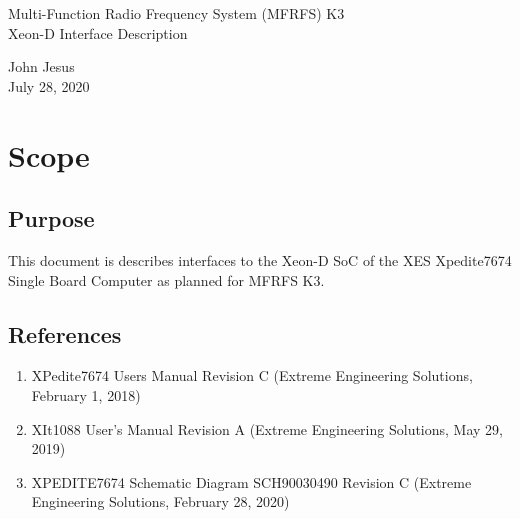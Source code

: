 \documentclass[12pt]{article}
\begin{document}
\thispagestyle{empty}
\begin{titlepage}
\begin{center}
        \vspace*{1cm}

        \LARGE{Multi-Function Radio Frequency System (MFRFS) K3 \\
            Xeon-D Interface Description}

        \vspace{0.5cm}
        \LARGE

        \vspace{1.5cm}

        \normalsize

        John Jesus \\
        July 28, 2020

        \vfill



        \vspace{0.8cm}




\end{center}
\end{titlepage}

\tableofcontents
\newpage

\section{Scope}
\subsection{Purpose}
This document is describes interfaces to the Xeon-D SoC of
the XES Xpedite7674 Single Board Computer as planned for MFRFS K3.

\subsection{References}
\begin{enumerate}
    \item XPedite7674 Users Manual Revision C (Extreme Engineering Solutions, February 1, 2018) \label{ref:board_man}
    \item XIt1088 User’s Manual Revision A (Extreme Engineering Solutions, May 29, 2019) \label{ref:rtm_man}
    \item XPEDITE7674 Schematic Diagram SCH90030490 Revision C (Extreme Engineering Solutions, February 28, 2020) \label{ref:schematic}
\end{enumerate}
\end{document}
